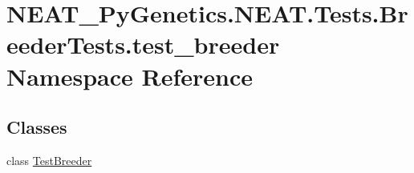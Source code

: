 \hypertarget{namespaceNEAT__PyGenetics_1_1NEAT_1_1Tests_1_1BreederTests_1_1test__breeder}{}\section{N\+E\+A\+T\+\_\+\+Py\+Genetics.\+N\+E\+A\+T.\+Tests.\+Breeder\+Tests.\+test\+\_\+breeder Namespace Reference}
\label{namespaceNEAT__PyGenetics_1_1NEAT_1_1Tests_1_1BreederTests_1_1test__breeder}
\subsection*{Classes}
\begin{DoxyCompactItemize}
\item 
class \hyperlink{classNEAT__PyGenetics_1_1NEAT_1_1Tests_1_1BreederTests_1_1test__breeder_1_1TestBreeder}{Test\+Breeder}
\end{DoxyCompactItemize}
